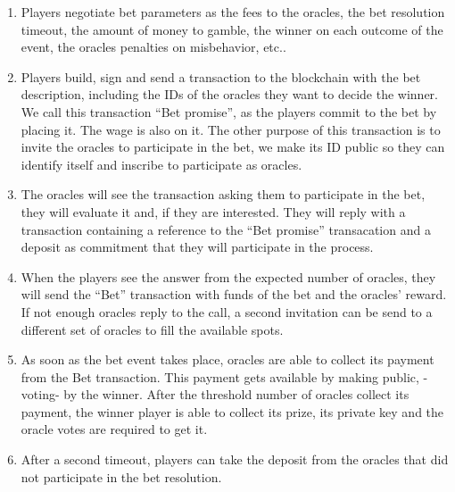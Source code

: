 \begin{enumerate}
  \item Players negotiate bet parameters as the fees to the oracles, the bet
      resolution timeout, the amount of money to gamble, the winner on each
      outcome of the event, the oracles penalties on misbehavior, etc..
  \item Players build, sign and send a transaction to the blockchain with the
      bet description, including the IDs of the oracles they want to decide the
      winner.
    We call this transaction ``Bet promise'', as the players commit to the bet by
      placing it. The wage is also on it.
    The other purpose of this transaction is to invite the oracles to
      participate in the bet, we make its ID public so they can identify itself
      and inscribe to participate as oracles.
  \item The oracles will see the transaction asking them to participate in the
      bet, they will evaluate it and, if they are interested.
    They will reply with a transaction containing a reference to the ``Bet
      promise'' transacation and a deposit as commitment that they will
      participate in the process.
  \item When the players see the answer from the expected number of oracles,
  	  they will send the ``Bet'' transaction with funds of the bet and the
  	  oracles' reward.
  	If not enough oracles reply to the call, a second invitation can be send to
  	  a different set of oracles to fill the available spots.
  \item As soon as the bet event takes place, oracles are able to collect its
  	  payment from the Bet transaction. This payment gets available by making
  	  public, -voting- by the winner.
  	After the threshold number of oracles collect its payment, the winner player
  	  is able to collect its prize, its private key and the oracle votes are
  	  required to get it.
  \item After a second timeout, players can take the deposit from the oracles
  	  that did not participate in the bet resolution.
\end{enumerate}

